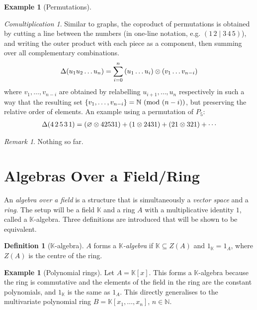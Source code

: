 \documentclass{article}
\theoremstyle{definition}
\newtheorem{Definition}{Definition}
\newtheorem{Example}{Example}
\newtheorem*{Example*}{Example}
\theoremstyle{remark}
\newtheorem*{Remark*}{Remark}
\theoremstyle{underline}
\theoremstyle{underline}
\newtheorem*{Comultiplication*}{Comultiplication}
\newcommand{\Mod}[1]{\ (\mathrm{mod}\ #1)}
\begin{document}
\begin{Example}[Permutations]
		\begin{Comultiplication*}
			Similar to graphs, the coproduct of permutations is obtained by cutting a line between the numbers (in one-line notation, e.g. $(1 \, 2 \mid 3\, 4\, 5)$), and writing the outer product with each piece as a component, then summing over all complementary combinations. 
			\begin{gather*}
			\Delta\pqty{u_1 u_2 \ldots u_n} = \sum_{i=0}^n \pqty{u_1\ldots u_i} \otimes \pqty{v_1\ldots v_{n - i}}
			\end{gather*}
			where $v_1, \ldots, v_{n - i}$ are obtained by relabelling $u_{i + 1}, \ldots, u_n$ respectively in such a way that the resulting set $\qty{v_1, \ldots, v_{n - i}} = \mathbb N \Mod {(n - i)}$, but preserving the relative order of elements. An example using a permutation of $P_5$:
			\begin{gather*}
			\Delta\pqty{4 \, 2 \, 5 \, 3 \, 1} = \pqty{\varnothing \otimes 42531} + \pqty{1 \otimes 2431} + \pqty{21 \otimes 321} + \cdots
			\end{gather*}
		\end{Comultiplication*}
		
		\begin{Remark*}
			Nothing so far.
		\end{Remark*}
	\end{Example}
	
	\section{Algebras Over a Field/Ring}
	
	An \emph{algebra over a field} is a structure that is simultaneously a \emph{vector space} and a \emph{ring}. The setup will be a field $\mathbb K$ and a ring $A$ with a multiplicative identity $1$, called a $\mathbb K$-algebra.
	Three definitions are introduced that will be shown to be equivalent.
	
	\begin{Definition}[$\mathbb K$-algebra]\label{def:k-Alg-1}
		$A$ forms a $\mathbb K$\emph{-algebra} if $\mathbb K \subseteq Z(A)$ and $1_{\mathbb K} = 1_A$, where $Z(A)$ is the centre of the ring.
	\end{Definition}
	
	\begin{Example*}[Polynomial rings]
		Let $A = \mathbb K[x]$. This forms a $\mathbb K$-algebra because the ring is commutative and the elements of the field in the ring are the constant polynomials, and $1_{\mathbb K}$ is the same as $1_A$. This directly generalises to the multivariate polynomial ring $B = \mathbb K[x_1,\ldots,x_n]$, $n \in \mathbb N$.
	\end{Example*}
	
\end{document}
